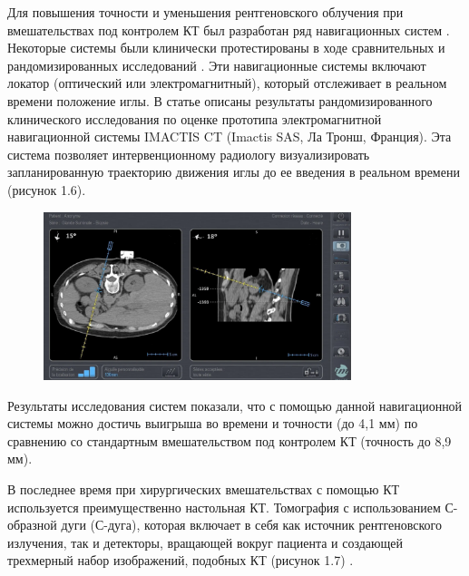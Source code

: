 Для повышения точности и уменьшения рентгеновского облучения при вмешательствах под контролем КТ был разработан ряд навигационных систем \cite{litlink15}. Некоторые системы были клинически протестированы в ходе сравнительных \cite{litlink16, litlink17} и рандомизированных исследований \cite{litlink18}. Эти навигационные системы включают локатор (оптический или электромагнитный), который отслеживает в реальном времени положение иглы. В статье \cite{litlink14} описаны результаты рандомизированного клинического исследования по оценке прототипа электромагнитной навигационной системы IMACTIS CT (Imactis SAS, Ла Тронш, Франция). Эта система позволяет интервенционному радиологу визуализировать запланированную траекторию движения иглы до ее введения в реальном времени (рисунок 1.6).

\begin{figure}[!h]
\begin{center}
\includegraphics[width=0.8\textwidth]{Рисунки/КТ.png}
\caption{\centering {}}
\label{част}
\end{center}
\end{figure}

Результаты исследования систем показали, что с помощью данной навигационной системы можно достичь выигрыша во времени и точности (до 4,1 мм) по сравнению со стандартным вмешательством под контролем КТ (точность до 8,9 мм).

В последнее время при хирургических вмешательствах с помощью КТ используется преимущественно настольная КТ. Томография с использованием С-образной дуги (С-дуга), которая включает в себя как источник рентгеновского излучения, так и детекторы, вращающей вокруг пациента и создающей
трехмерный набор изображений, подобных КТ (рисунок 1.7) \cite{litlink19,litlink20}.

